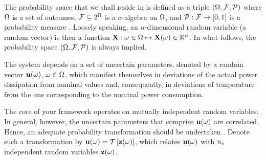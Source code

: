 The probability space that we shall reside in is defined as a triple $(\Omega, \mathcal{F}, \mathcal{P})$ where $\Omega$ is a set of outcomes, $\mathcal{F} \subseteq 2^\Omega$ is a $\sigma$-algebra on $\Omega$, and $\mathcal{P}: \mathcal{F} \to [0, 1]$ is a probability measure \cite{maitre2010}.
Loosely speaking, an $n$-dimensional random variable (a random vector) is then a function $\mathbf{X}: \omega \in \Omega \mapsto \mathbf{X}(\omega) \in \mathbb{R}^n$.
In what follows, the probability space $(\Omega, \mathcal{F}, \mathcal{P})$ is always implied.

The system depends on a set of uncertain parameters, denoted by a random vector $\mathbf{u}(\omega)$, $\omega \in \Omega$, which manifest themselves in deviations of the actual power dissipation from nominal values and, consequently, in deviations of temperature from the one corresponding to the nominal power consumption.

The core of your framework operates on mutually independent random variables.
In general, however, the uncertain parameters that comprise $\mathbf{u}(\omega)$ are correlated.
Hence, an adequate probability transformation should be undertaken \cite{eldred2008}.
Denote such a transformation by $\vU(\o) = \oTransform{\vZ(\o)}$, which relates $\mathbf{u}(\omega)$ with ${n_\text{v}}$ independent random variables $\mathbf{z}(\omega)$.
